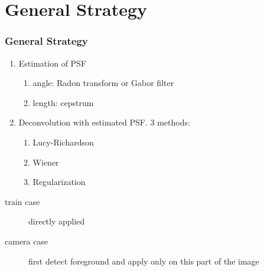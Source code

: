 \section[G. Strategy]{General Strategy}

\begin{frame}
	\frametitle{General Strategy}
	\begin{enumerate}
	\item Estimation of PSF
		\begin{enumerate}
		\item angle: Radon transform or Gabor filter
		\item length: cepstrum
		\end{enumerate}
	\item Deconvolution with estimated PSF. 3 methods:
		\begin{enumerate}
		\item Lucy-Richardson
		\item Wiener
		\item Regularization
		\end{enumerate}
	\end{enumerate}
	
	\begin{description}
	\item[train case] directly applied
	\item[camera case] first detect foreground and apply only on this part of the image
	\end{description}
\end{frame}